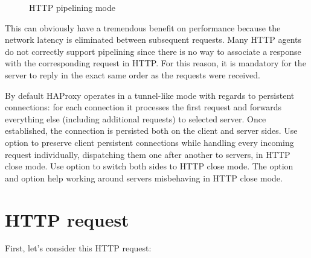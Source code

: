 \begin{figure}[!ht]
\centering
{}

\caption{HTTP pipelining mode}
\label{fig:http_pipelining}
\end{figure}

This can obviously have a tremendous benefit on performance because the network
latency is eliminated between subsequent requests. Many HTTP agents do not
correctly support pipelining since there is no way to associate a response with
the corresponding request in HTTP. For this reason, it is mandatory for the
server to reply in the exact same order as the requests were received.

By default HAProxy operates in a tunnel-like mode with regards to persistent
connections: for each connection it processes the first request and forwards
everything else (including additional requests) to selected server. Once
established, the connection is persisted both on the client and server
sides. Use option  to preserve client persistent connections
while handling every incoming request individually, dispatching them one after
another to servers, in HTTP close mode. Use option  to switch both
sides to HTTP close mode. The option  and option  help working around servers misbehaving in HTTP close
mode.

\section{HTTP request}
\label{sec:http_request}

First, let's consider this HTTP request:

